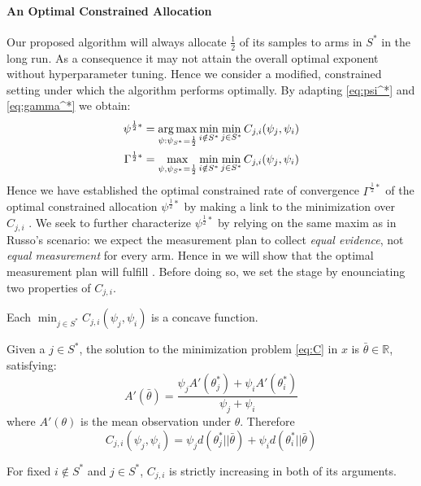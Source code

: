 \paragraph{An Optimal Constrained Allocation}

Our proposed algorithm will always allocate $\frac{1}{2}$ of its samples to arms in $S^*$ in the long run. As a consequence it may not attain the overall optimal exponent without hyperparameter tuning. Hence we consider a modified, constrained setting under which the algorithm performs optimally. By adapting \eqref{eq:psi^*} and \eqref{eq:gamma^*} we obtain:
\begin{align}
  \psi^{\frac{1}{2}*} &= \operatorname*{arg\,max}_{\psi: \psi_{S^*}=\frac{1}{2}} \min_{i \notin S^*}\min_{j \in S^*} C_{j, i}(\psi_j, \psi_i) \label{eq:constrained_optimal_psi}\\
  \Gamma^{\frac{1}{2}*} &= \max_{\psi, \psi_{S^*} = \frac{1}{2}} \min_{i \notin S^*} \min_{j \in S^*} C_{j, i}(\psi_j, \psi_i) \label{eq:constrained_optimal_gamma}
\end{align}
Hence we have established the optimal constrained rate of convergence $\Gamma^{\frac{1}{2}*}$ of the optimal constrained allocation $\psi^{\frac{1}{2}*}$ by making a link to the minimization over $C_{j, i}$ . We seek to further characterize $\psi^{\frac{1}{2}*}$ by relying on the same maxim as in Russo's scenario: we expect the measurement plan to collect \emph{equal evidence}, not \emph{equal measurement} for every arm. Hence in  we will show that the optimal measurement plan will fulfill . Before doing so, we set the stage by enounciating two properties of $C_{j, i}$.

\begin{lemma}\label{lemma:C_concave}
  Each $\min_{j \in S^*} C_{j, i}(\psi_j, \psi_i)$ is a concave function.
\end{lemma}

\begin{lemma}\label{lemma:C_unique_solution}
  Given a $j \in S^*$, the solution to the minimization problem \eqref{eq:C} in $x$ is $\bar{\theta} \in \mathbb{R}$, satisfying:
  \[A'(\bar{\theta}) = \frac{\psi_j A'(\theta_j^*) + \psi_i A'(\theta_i^*)}{\psi_j + \psi_i}\]
  where $A'(\theta)$ is the mean observation under $\theta$. Therefore
  \[C_{j, i}(\psi_j, \psi_i) = \psi_j d(\theta^*_j || \bar{\theta}) + \psi_i d(\theta^*_i || \bar{\theta})\]
\end{lemma}

\begin{lemma}\label{lemma:C_strictly_increasing}
  For fixed $i \notin S^*$ and $j \in S^*$, $C_{j, i}$ is strictly increasing in both of its arguments.
\end{lemma}

